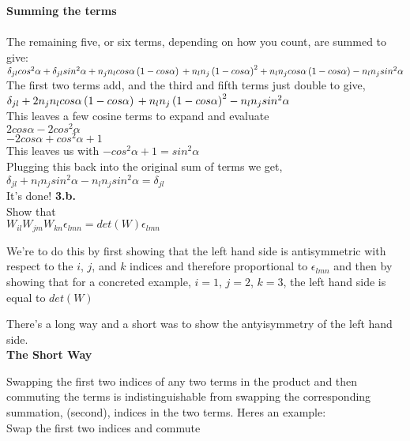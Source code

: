 \documentclass[prb,preprint]
{revtex4-1}
\begin{document}
{\bf Summing the terms}\\\\
The remaining five, or six terms, depending on how you count, are summed to give:\\
$\delta_{jl} cos^2 \alpha + \delta_{jl} sin^2 \alpha + n_j n_l cos \alpha \left(1 - cos \alpha \right)\\
+ n_l n_j \left(1 - cos \alpha \right)^2 + n_l n_j cos \alpha \left(1 - cos \alpha \right) - n_l n_j sin^2 \alpha$\\
The first two terms add, and the third and fifth terms just double to give, \\
$\delta_{jl} + 2 n_j n_l cos \alpha \left(1 - cos \alpha \right)\\
+ n_l n_j \left(1 - cos \alpha \right)^2 - n_l n_j sin^2 \alpha$\\
This leaves a few cosine terms to expand and evaluate\\
$2 cos\alpha - 2 cos^2 \alpha$\\
$-2 cos\alpha + cos^2 \alpha + 1$\\
This leaves us with $-cos^2 \alpha + 1 = sin^2 \alpha$\\
Plugging this back into the original sum of terms we get, \\
$\delta_{jl} + n_l n_j sin^2 \alpha - n_l n_j sin^2 \alpha = \delta_{jl}$\\
It's done!
\newpage
\bigskip
{\bf 3.b.}  
\\
Show that 
\\
$W_{il}W_{jm}W_{kn}\epsilon_{lmn} = det\left(W\right)\epsilon_{lmn}$

We're to do this by first showing that the left hand side is antisymmetric with respect to the $i$, $j$, and $k$ indices and therefore proportional to $\epsilon_{lmn}$ and then by showing that for a concreted example, $i=1$, $j=2$, $k=3$, the left hand side is equal to $det\left(W\right)$

There's a long way and a short was to show the antyisymmetry of the left hand side.\\


\textbf{The Short Way}

Swapping the first two indices of any two terms in the product and then commuting the terms is indistinguishable from swapping the corresponding summation, (second), indices in the two terms.  Heres an example:\\

Swap the first two indices and commute
\end{document}
